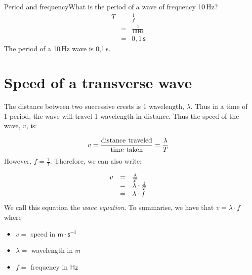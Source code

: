 \begin{definition}
\begin{wex}{Period and frequency}{What is the period of a wave of frequency 10\,Hz?}
{\begin{eqnarray*}
T&=&\frac{1}{f}\\
&=&\frac{1}{10\,\mathsf{Hz}}\\
&=&0,1\,\mathsf{s}
\end{eqnarray*}
The period of a 10\,Hz wave is 0,1\,s.}
\end{wex}

    \noindent
      \label{m38806*uid21}
            \section{Speed of a transverse wave}
            \nopagebreak
   
        \label{m38806*id319706}The distance between two successive crests is 1 wavelength, $\lambda $. Thus in a time of 1 period, the wave will travel 1 wavelength in distance. Thus the speed of the wave, $v$, is:\par 
        \label{m38806*id319732}\nopagebreak\noindent{}
    \begin{equation}\nonumber
    v=\frac{\text{distance}\phantom{\rule{4.pt}{0ex}}\text{traveled}}{\text{time}\phantom{\rule{4.pt}{0ex}}\text{taken}}=\frac{\lambda }{T}
      \end{equation}
        \label{m38806*id319776}However, $f=\frac{1}{T}$. Therefore, we can also write:\par 
        \label{m38806*id319802}\nopagebreak\noindent{}
          
    \begin{equation}\nonumber
    \begin{array}{ccc}\hfill v& =& \frac{\lambda }{T}\hfill \\ & =& \lambda \ensuremath{\cdot}\frac{1}{T}\hfill \\ & =& \lambda \ensuremath{\cdot}f\hfill \end{array}
      \end{equation}
        \label{m38806*id319870}We call this equation the \textsl{wave equation}. To summarise, we have that $v=\lambda \ensuremath{\cdot}f$ where\par 
        \label{m38806*id319901}\begin{itemize}[noitemsep]
            \label{m38806*uid22}\item $v=$ speed in $\mathsf{m}\ensuremath{\cdot}\mathsf{s}{}^{-1}$\label{m38806*uid23}\item $\lambda =$ wavelength in $\mathsf{m}$
\label{m38806*uid24}\item $f=$ frequency in $\mathsf{Hz}$
\end{itemize}


\end{definition}
